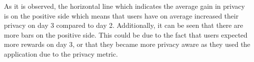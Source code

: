 As it is observed, the horizontal line which indicates the average gain in privacy is on the positive side which means that users have on average increased their privacy on day 3 compared to day 2. Additionally, it can be seen that there are more bars on the positive side. This could be due to the fact that users expected more rewards on day 3, or that they became more privacy aware as they used the application due to the privacy metric.

%
%
